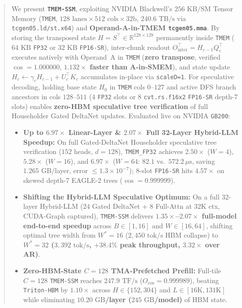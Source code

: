 \documentclass[conference,10pt]{IEEEtran}
\begin{document}
\begin{abstract}
We present \textbf{\texttt{TMEM-SSM}}, exploiting NVIDIA Blackwell's $256\text{ KB/SM}$ Tensor Memory (\texttt{TMEM}, $128\text{ lanes}\times 512\text{ cols}\times 32\text{b}$, $240.6\text{ TB/s}$ via \texttt{tcgen05.ld/st.x64}) and \textbf{Operand-A-in-TMEM \texttt{tcgen05.mma}}. By storing the transposed state $H = S^\top \in \mathbb{R}^{128\times 128}$ permanently inside \texttt{TMEM} ($64\text{ KB}$ \texttt{FP32} or $32\text{ KB}$ \texttt{FP16-SR}), inter-chunk readout $O_{\text{inter}}^\top = H_{c-1} Q_c^\top$ executes natively with Operand~A in \texttt{TMEM} (\textbf{zero transpose}, verified $\cos{=}1.000000$, \textbf{$1.132\times$ faster than A-in-SMEM}), and state update $H_c \leftarrow \gamma_c H_{c-1} + U_c^\top K_c$ accumulates in-place via \texttt{scaleD=1}. For speculative decoding, holding base state $H_0$ in \texttt{TMEM} cols $0$--$127$ and active DFS branch ancestors in cols $128$--$511$ ($4$ \texttt{FP32} slots or $8$ \texttt{cvt.rs.f16x2} \texttt{FP16-SR} depth-7 slots) enables \textbf{zero-HBM speculative tree verification} of full Householder Gated DeltaNet updates. Evaluated live on NVIDIA \texttt{GB200}:
\begin{itemize}
    \item \textbf{Up to $6.97\times$ Linear-Layer \& $2.07\times$ Full 32-Layer Hybrid-LLM Speedup:} On full Gated-DeltaNet Householder speculative tree verification ($152$ heads, $d{=}128$), \texttt{TMEM\_FP32} achieves \textbf{$2.50\times$} ($W{=}4$), \textbf{$5.28\times$} ($W{=}16$), and \textbf{$6.97\times$} ($W{=}64$: $82.1$ vs.\ $572.2\,\mu\text{s}$, saving $1.265\text{ GB}$/layer, error $\le 1.3{\times}10^{-7}$); 8-slot \texttt{FP16-SR} hits \textbf{$4.57\times$} on skewed depth-7 EAGLE-2 trees ($\cos{=}0.999999$).
    \item \textbf{Shifting the Hybrid-LLM Speculative Optimum:} On a full 32-layer Hybrid-LLM ($24$ Gated DeltaNet + $8$ Full-Attn at $32\text{K}$ ctx, CUDA-Graph captured), \texttt{TMEM-SSM} delivers \textbf{$1.35\times$--$2.07\times$ full-model end-to-end speedup} across $B \in [1, 16]$ and $W \in [16, 64]$, shifting optimal tree width from $W^*{=}16$ ($2{,}450\text{ tok/s}$ HBM collapse) to \textbf{$W^*{=}32$ ($3{,}392\text{ tok/s}$, $+38.4\%$ peak throughput, $3.32\times$ over AR)}.
    \item \textbf{Zero-HBM-State $C{=}128$ TMA-Prefetched Prefill:} Full-tile $C{=}128$ \texttt{TMEM-SSM} reaches \textbf{$247.9\text{ TF/s}$} ($O_{\cos}{=}0.999989$), beating \texttt{Triton-HBM} by \textbf{$1.10\times$} across $H \in \{152, 304\}$ and $L \in [16\text{K}, 131\text{K}]$ while eliminating \textbf{$10.20\text{ GB}$/layer ($245\text{ GB}$/model)} of HBM state.
\end{itemize}
\end{abstract}
\end{document}
